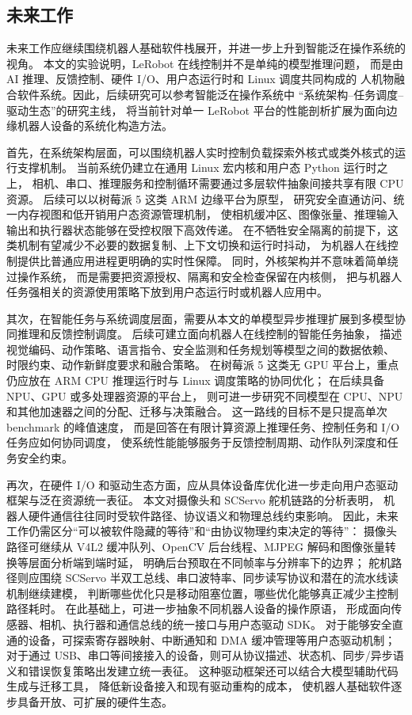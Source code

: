 \subsection{未来工作}

未来工作应继续围绕机器人基础软件栈展开，并进一步上升到智能泛在操作系统的视角。
本文的实验说明，LeRobot 在线控制并不是单纯的模型推理问题，
而是由 AI 推理、反馈控制、硬件 I/O、用户态运行时和 Linux 调度共同构成的
人机物融合软件系统。因此，后续研究可以参考智能泛在操作系统中
``系统架构--任务调度--驱动生态''的研究主线，
将当前针对单一 LeRobot 平台的性能剖析扩展为面向边缘机器人设备的系统化构造方法。

首先，在系统架构层面，可以围绕机器人实时控制负载探索外核式或类外核式的运行支撑机制。
当前系统仍建立在通用 Linux 宏内核和用户态 Python 运行时之上，
相机、串口、推理服务和控制循环需要通过多层软件抽象间接共享有限 CPU 资源。
后续可以以树莓派 5 这类 ARM 边缘平台为原型，
研究安全直通访问、统一内存视图和低开销用户态资源管理机制，
使相机缓冲区、图像张量、推理输入输出和执行器状态能够在受控权限下高效传递。
在不牺牲安全隔离的前提下，这类机制有望减少不必要的数据复制、上下文切换和运行时抖动，
为机器人在线控制提供比普通应用进程更明确的实时性保障。
同时，外核架构并不意味着简单绕过操作系统，
而是需要把资源授权、隔离和安全检查保留在内核侧，
把与机器人任务强相关的资源使用策略下放到用户态运行时或机器人应用中。

其次，在智能任务与系统调度层面，需要从本文的单模型异步推理扩展到多模型协同推理和反馈控制调度。
后续可建立面向机器人在线控制的智能任务抽象，
描述视觉编码、动作策略、语言指令、安全监测和任务规划等模型之间的数据依赖、
时限约束、动作新鲜度要求和融合策略。
在树莓派 5 这类无 GPU 平台上，重点仍应放在 ARM CPU 推理运行时与 Linux 调度策略的协同优化；
在后续具备 NPU、GPU 或多处理器资源的平台上，
则可进一步研究不同模型在 CPU、NPU 和其他加速器之间的分配、迁移与决策融合。
这一路线的目标不是只提高单次 benchmark 的峰值速度，
而是回答在有限计算资源上推理任务、控制任务和 I/O 任务应如何协同调度，
使系统性能能够服务于反馈控制周期、动作队列深度和任务安全约束。

再次，在硬件 I/O 和驱动生态方面，应从具体设备库优化进一步走向用户态驱动框架与泛在资源统一表征。
本文对摄像头和 SCServo 舵机链路的分析表明，
机器人硬件通信往往同时受软件路径、协议语义和物理总线约束影响。
因此，未来工作仍需区分``可以被软件隐藏的等待''和``由协议物理约束决定的等待''：
摄像头路径可继续从 V4L2 缓冲队列、OpenCV 后台线程、MJPEG 解码和图像张量转换等层面分析端到端时延，
明确后台预取在不同帧率与分辨率下的边界；
舵机路径则应围绕 SCServo 半双工总线、串口波特率、同步读写协议和潜在的流水线读机制继续建模，
判断哪些优化只是移动阻塞位置，哪些优化能够真正减少主控制路径耗时。
在此基础上，可进一步抽象不同机器人设备的操作原语，
形成面向传感器、相机、执行器和通信总线的统一接口与用户态驱动 SDK。
对于能够安全直通的设备，可探索寄存器映射、中断通知和 DMA 缓冲管理等用户态驱动机制；
对于通过 USB、串口等间接接入的设备，则可从协议描述、状态机、同步/异步语义和错误恢复策略出发建立统一表征。
这种驱动框架还可以结合大模型辅助代码生成与迁移工具，
降低新设备接入和现有驱动重构的成本，
使机器人基础软件逐步具备开放、可扩展的硬件生态。

